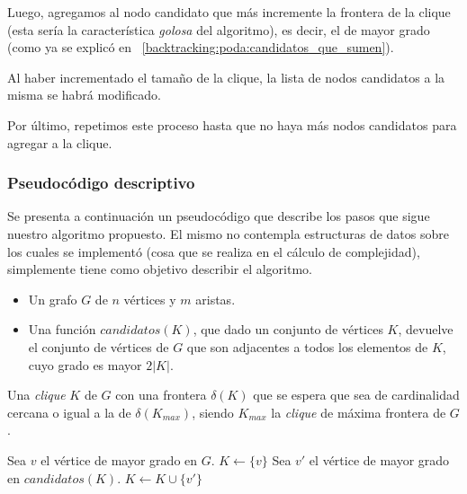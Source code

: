 \par Luego, agregamos al nodo candidato que m\'as incremente la frontera
    de la clique (esta ser\'ia la caracter\'istica \emph{golosa}
    del algoritmo), es decir, el de mayor grado (como ya se explic\'o
    en ~\ref{backtracking:poda:candidatos_que_sumen}).

\par Al haber incrementado el tama\~no de la clique, la lista de
    nodos candidatos a la misma se habr\'a modificado.

\par Por \'ultimo, repetimos este proceso hasta que no haya m\'as
    nodos candidatos para agregar a la clique.

\bigskip

\subsubsection{Pseudoc\'odigo descriptivo}
\par Se presenta a continuaci\'on un pseudoc\'odigo que describe los pasos que sigue
    nuestro algoritmo propuesto. El mismo no contempla estructuras de datos sobre
    los cuales se implement\'o (cosa que se realiza en el c\'alculo de complejidad),
    simplemente tiene como objetivo describir el algoritmo.

\begin{pseudocodigo}
    \Require\Statex
        \begin{itemize}
            \item Un grafo $G$ de $n$ v\'ertices y $m$ aristas.

            \item Una funci\'on $candidatos(K)$, que dado un conjunto de v\'ertices
                $K$, devuelve el conjunto de v\'ertices de $G$ que son adjacentes
                a todos los elementos de $K$, cuyo grado es mayor $2|K|$.
        \end{itemize}

    \Statex

    \Ensure Una \emph{clique} $K$ de $G$ con una frontera $\delta(K)$ que se
        espera que sea de cardinalidad cercana o igual a la de $\delta(K_{max})$,
        siendo $K_{max}$ la \emph{clique} de m\'axima frontera de $G$.

    \Statex

    \State Sea $v$ el v\'ertice de mayor grado en $G$.
    \State $K \gets \{v\}$
        \State Sea $v'$ el v\'ertice de mayor grado en $candidatos(K)$.
        \State $K \gets K \cup \{v'\}$
    \EndWhile

    \State {}
\end{pseudocodigo}

